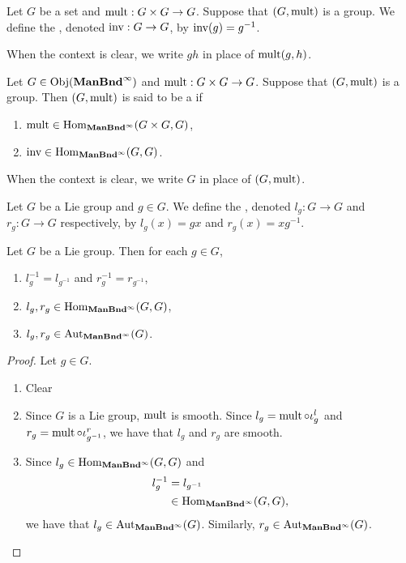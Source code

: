 \documentclass{book}
\begin{document}
\begin{defn}
	Let $G$ be a set and $\operatorname{\text{mult}}:G \times G \rightarrow G$. Suppose that $(G, \operatorname{\text{mult}})$ is a group. We define the , denoted $\operatorname{\text{inv}}: G \rightarrow G$, by $\operatorname{\text{inv}}(g) = g^{-1}$.
\end{defn}

\begin{note}
	When the context is clear, we write $gh$ in place of $\operatorname{\text{mult}}(g,h)$.
\end{note}

\begin{defn}
	Let $G \in \operatorname{Obj}(\operatorname*{\text{\textbf{ManBnd}}^{\infty}})$ and $\operatorname{\text{mult}}:G \times G \rightarrow G$. Suppose that $(G, \operatorname{\text{mult}})$ is a group. Then $(G, \operatorname{\text{mult}})$ is said to be a  if 
	\begin{enumerate}
		\item $\operatorname{\text{mult}} \in \operatorname{Hom}_{\operatorname*{\text{\textbf{ManBnd}}^{\infty}}}(G \times G, G)$,
		\item $\operatorname{\text{inv}} \in \operatorname{Hom}_{\operatorname*{\text{\textbf{ManBnd}}^{\infty}}}(G, G)$.
	\end{enumerate}
\end{defn}

\begin{note}
	When the context is clear, we write $G$ in place of $(G, \operatorname{\text{mult}})$.
\end{note}

\begin{defn} 
	Let $G$ be a Lie group and $g \in G$. We define the , denoted $l_g:G \rightarrow G$ and $r_g:G \rightarrow G$ respectively, by $l_g(x) = gx$ and $r_g(x) = xg^{-1}$. 
\end{defn}

\begin{ex} 
	Let $G$ be a Lie group. Then for each $g \in G$, 
	\begin{enumerate}
		\item $l_g^{-1} = l_{g^{-1}}$ and $r_g^{-1} = r_{g^{-1}}$,
		\item $l_g, r_g \in \operatorname{Hom}_{\operatorname*{\text{\textbf{ManBnd}}^{\infty}}}(G, G)$,
		\item $l_g, r_g \in \operatorname{Aut}_{\operatorname*{\text{\textbf{ManBnd}}^{\infty}}}(G)$. 
	\end{enumerate}
\end{ex}

\begin{proof} Let $g \in G$.
	\begin{enumerate}
		\item Clear
		\item Since $G$ is a Lie group, $\operatorname{\text{mult}}$ is smooth. Since $l_g = \operatorname{\text{mult}} \circ \iota^l_g$ and $r_g = \operatorname{\text{mult}} \circ \iota^r_{g^{-1}}$, we have that $l_g$ and $r_g$ are smooth.
		\item Since $l_g \in \operatorname{Hom}_{\operatorname*{\text{\textbf{ManBnd}}^{\infty}}}(G, G)$ and 
		\begin{align*}
			l_g^{-1}
			& = l_{g^{-1}} \\
			& \in \operatorname{Hom}_{\operatorname*{\text{\textbf{ManBnd}}^{\infty}}}(G, G),
		\end{align*}
		we have that $l_g \in \operatorname{Aut}_{\operatorname*{\text{\textbf{ManBnd}}^{\infty}}}(G)$. Similarly, $r_g \in \operatorname{Aut}_{\operatorname*{\text{\textbf{ManBnd}}^{\infty}}}(G)$.
	\end{enumerate}
\end{proof}
\end{document}
